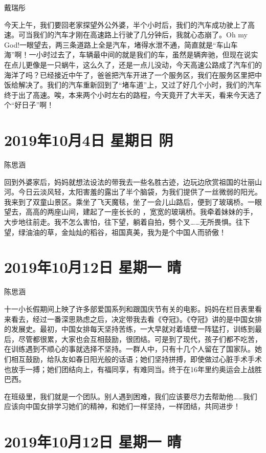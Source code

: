 戴瑞彤

今天上午，我们要回老家探望外公外婆，半个小时后，我们的汽车成功驶上了高速。可当我们的汽车才刚在高速路上行驶了几分钟后，我就心态崩了。Oh
my
God!一眼望去，两三条道路上全是汽车，堵得水泄不通，简直就是``车山车海''啊！一小时过去了，车辆最中间的就是我们的车，虽然是辆奔驰，但现在说实在点儿更像是一只蜗牛，这么久了，还是一点儿没动，今天高速公路成了汽车们的海洋了吗？已经接近中午了，爸爸把汽车开进了一个服务区，我们在服务区里把中饭给解决了。我们的汽车重新回到了``堵车道''上，又过了好几个小时，我们的汽车终于出了高速。唉，本来两个小时左右的路程，今天竟开了大半天，看来今天选了个``好日子''啊！

\section{2019年10月4日 星期日 阴}

陈思涵

回到外婆家后，妈妈就想法设法的带我去一些名胜古迹，边玩边欣赏祖国的壮丽山河。今日云淡风轻，太阳害羞的露出了半个脑袋，为我们提供了一丝微弱的阳光。我来到了双童山景区。乘坐了飞天魔毯，坐了一会儿山路后，便到了玻璃桥。一眼望去，高高的两座山间，建起了一座长长的
，宽宽的玻璃桥。我牵着妹妹的手，大步地往前走。我不怎么害怕，往下望，躺着自拍，劈个叉\ldots\ldots 无所畏惧。往下望，绿油油的草，金灿灿的稻谷，祖国真美，我为是个中国人而骄傲！

\section{2019年10月12日 星期一 晴}

陈思涵

十一小长假期间上映了许多部爱国系列和跟国庆节有关的电影。妈妈在栏目表里看来看去，经过一番深思熟虑之后，决定带我去看《夺冠》。《夺冠》讲的是中国女排的发展史。最初，中国女排每天坚持苦练，一大早就对着墙壁一阵猛打，训练到最后，尽管都很累，大家也会互相鼓励，很团结。可是到了现代，孩子们都不吃苦，在训练遇到不顺心的事就选择不坚持。一群人中，只有十几个人留在了国家队。她们相互鼓励，给队友如春日阳光般的话语；她们坚持拼搏，即使做过心脏手术手术也放手一搏；她们团结向上，有福同享，有难同当。终于在16年里约奥运会上战胜巴西。

在班级里，我们就是一个团队。别人遇到困难，我们应该要尽力去帮助他\ldots\ldots 我们应该向中国女排学习她们的精神，和她们一样坚持，一样团结，共同进步！

\section{2019年10月12日 星期一 晴}

